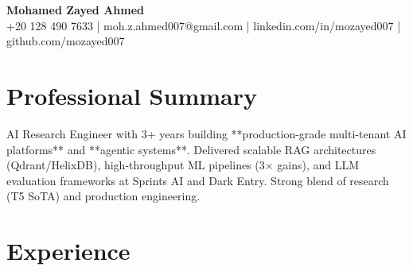 \documentclass[10pt, letterpaper]{extarticle}
\begin{document}
\begin{center}
    \textbf{\Large Mohamed Zayed Ahmed} \\
    \vspace{2pt}
    \small{+20 128 490 7633 \quad | \quad moh.z.ahmed007@gmail.com \quad | \quad linkedin.com/in/mozayed007 \quad | \quad github.com/mozayed007}
\end{center}

\section{Professional Summary}
AI Research Engineer with 3+ years building **production-grade multi-tenant AI platforms** and **agentic systems**. Delivered scalable RAG architectures (Qdrant/HelixDB), high-throughput ML pipelines (3× gains), and LLM evaluation frameworks at Sprints AI and Dark Entry. Strong blend of research (T5 SoTA) and production engineering.

\section{Experience}
\end{document}
